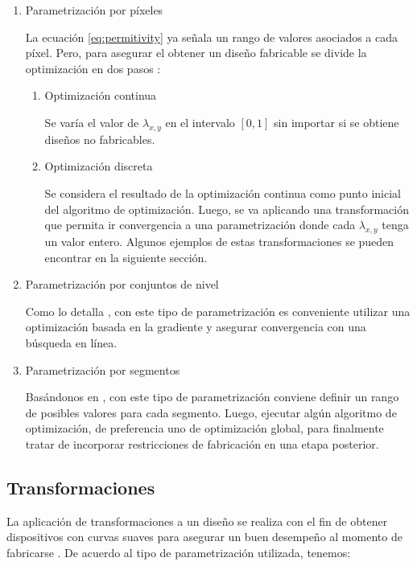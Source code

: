\begin{enumerate}


\item{Parametrización por píxeles}


La ecuación \ref{eq:permitivity} ya señala un rango de valores asociados a cada píxel. 
Pero, para asegurar el obtener un diseño fabricable se divide la optimización en dos pasos \citep{Su2020}:

  \begin{enumerate}
  \item Optimización continua
  
  Se varía el valor de $\lambda_{x,y}$ en el intervalo $[0, 1]$ sin importar si se obtiene diseños no fabricables.

  \item Optimización discreta

  Se considera el resultado de la optimización continua como punto inicial del algoritmo de optimización.
  Luego, se va aplicando una transformación que permita ir convergencia a una parametrización donde cada $\lambda_{x, y}$ tenga un valor entero.
  Algunos ejemplos de estas transformaciones se pueden encontrar en la siguiente sección.

  \end{enumerate}

\item{Parametrización por conjuntos de nivel}

Como lo detalla \cite{Piggott2017}, con este tipo de parametrización es conveniente utilizar una optimización basada en la gradiente y
asegurar convergencia con una búsqueda en línea.

\item{Parametrización por segmentos}

Basándonos en \cite{Prosopio-Galarza2019}, con este tipo de parametrización conviene definir un rango de posibles valores para cada segmento.
Luego, ejecutar algún algoritmo de optimización, de preferencia uno de optimización global, para finalmente tratar de incorporar restricciones de fabricación en una etapa posterior.

\end{enumerate}

\subsection{Transformaciones}

La aplicación de transformaciones a un diseño se realiza con el fin de obtener dispositivos con curvas suaves para asegurar un buen desempeño al momento de fabricarse \citep{Su2020}. 
De acuerdo al tipo de parametrización utilizada, tenemos:

